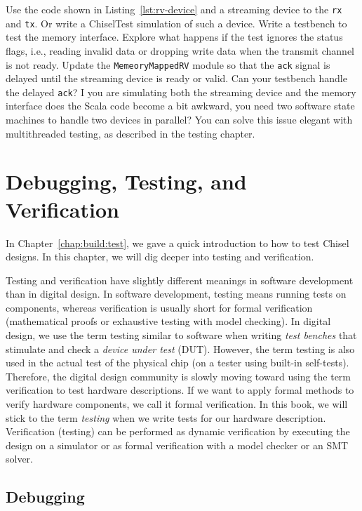 \documentclass[%
    10pt,
    headinclude, footinclude=false,
    openright, %
    notitlepage,
    cleardoublepage=empty,
    headsepline,
    numbers=noenddot,
    bibliography=totoc, index=totoc,
    ]{scrbook}
\newcommand{\code}[1]{{\lstinline[basicstyle=\small\ttfamily]{#1}}}
\begin{document}
Use the code shown in Listing~\ref{lst:rv-device} and a streaming device to the \code{rx}
and \code{tx}. Or write a ChiselTest simulation of such a device. Write a testbench
to test the memory interface. Explore what happens if the test ignores the status flags,
i.e., reading invalid data or dropping write data when the transmit channel is not ready.
Update the \code{MemeoryMappedRV} module so that the \code{ack} signal is delayed until
the streaming device is ready or valid. Can your testbench handle the delayed \code{ack}?
I you are simulating both the streaming device and the memory interface does the Scala
code become a bit awkward, you need two software state machines to handle
two devices in parallel? You can solve this issue elegant with multithreaded testing,
as described in the testing chapter.

\chapter{Debugging, Testing, and Verification}
\label{chap:testing}



In Chapter~\ref{chap:build:test}, we gave a quick introduction to how to test
Chisel designs. In this chapter, we will dig deeper into testing and
verification.

Testing and verification have slightly different meanings in software development
than in digital design. In software development, testing means running tests on components,
whereas verification is usually short for formal verification (mathematical proofs or exhaustive testing
with model checking). In digital design, we use the term testing similar to software when writing
\emph{test benches} that stimulate and check a \emph{device under test} (DUT). However, the term testing
is also used in the actual test of the physical chip (on a tester using built-in self-tests).
Therefore, the digital design community is slowly moving toward using the term verification to
test hardware descriptions. If we want to apply formal methods to verify hardware
components, we call it formal verification.
In this book, we will stick to the term \emph{testing} when we write tests for our hardware description.
Verification (testing) can be performed as dynamic verification by executing the design on a simulator or as formal verification with a model checker or an SMT solver.

\section{Debugging}
\end{document}
